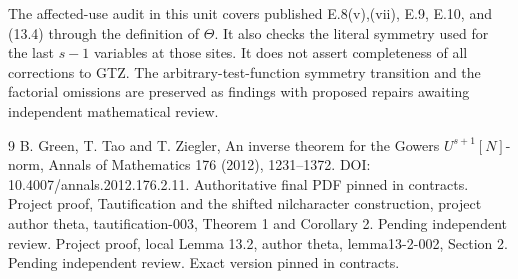 \documentclass[11pt]{article}
\begin{document}
The affected-use audit in this unit covers published E.8(v),(vii),
E.9, E.10, and (13.4) through the definition of $\Theta$.
It also checks the literal symmetry used for the last $s-1$ variables
at those sites. It does not assert completeness of all corrections to
GTZ. The arbitrary-test-function symmetry transition and the factorial
omissions are preserved as findings with proposed repairs awaiting
independent mathematical review.

\begin{thebibliography}{9}
 B. Green, T. Tao and T. Ziegler,
An inverse theorem for the Gowers $U^{s+1}[N]$-norm,
Annals of Mathematics 176 (2012), 1231--1372.
DOI: 10.4007/annals.2012.176.2.11. Authoritative final PDF pinned in contracts.
 Project proof, Tautification and the shifted nilcharacter
construction, project author theta,
tautification-003, Theorem 1 and Corollary 2. Pending independent review.
 Project proof, local Lemma 13.2, author
theta, lemma13-2-002, Section 2.
Pending independent review. Exact version pinned in contracts.
\end{thebibliography}
\end{document}
